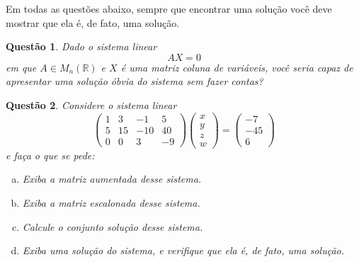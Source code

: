 \documentclass[a4paper,12pt]{article}
\author{``1º Testinho'' - GAAL}
\date{29 de Março de 2019}
\title{}
\def\R{\mathbb R}
\newtheorem{qst}{Questão}
\begin{document}
\maketitle

Em todas as questões abaixo, sempre que encontrar uma solução você deve mostrar que ela é, de fato, uma solução.

\begin{qst}
Dado o sistema linear
\[AX=0\] em que $A\in M_n(\R)$ e $X$ é uma matriz coluna de variáveis, você seria capaz de apresentar uma solução óbvia do sistema sem fazer contas?
\end{qst}

\begin{qst}
Considere o sistema linear
\[\begin{pmatrix}
1&3&-1&5\\5&15&-10&40\\0&0&3&-9
\end{pmatrix}\begin{pmatrix}x\\y\\z\\w
\end{pmatrix}=\begin{pmatrix}
-7\\-45\\6
\end{pmatrix}\]e faça o que se pede:
\begin{enumerate}[a)]
	\item Exiba a matriz aumentada desse sistema.
	\item Exiba a matriz escalonada desse sistema.
	\item Calcule o conjunto solução desse sistema.
	\item Exiba uma solução do sistema, e verifique que ela é, de fato, uma solução.
\end{enumerate}
\end{qst}
\end{document}
